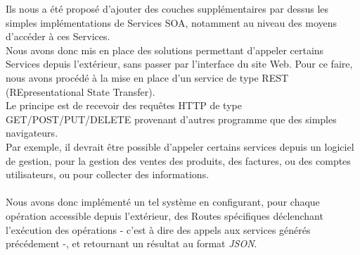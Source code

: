 Ils nous a été proposé d'ajouter des couches supplémentaires par dessus les simples implémentations de Services SOA, notamment au niveau des moyens d'accéder à ces Services.\\
Nous avons donc mis en place des solutions permettant d'appeler certains Services depuis l'extérieur, sans passer par l'interface du site Web. Pour ce faire, nous avons procédé à la mise en place d'un service de type REST (REpresentational State Transfer).\\
Le principe est de recevoir des requêtes HTTP de type GET/POST/PUT/DELETE provenant d'autres programme que des simples navigateurs. \\
Par exemple, il devrait être possible d'appeler certains services depuis un logiciel de gestion, pour la gestion des ventes des produits, des factures, ou des comptes utilisateurs, ou pour collecter des informations.
\\\\
Nous avons donc implémenté un tel système en configurant, pour chaque opération accessible depuis l'extérieur, des Routes spécifiques déclenchant l'exécution des opérations - c'est à dire des appels aux services générés précédement -, et retournant un résultat au format \textit{JSON}.

\clearpage
